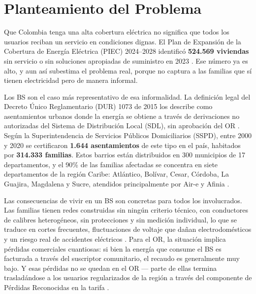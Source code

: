 \section{Planteamiento del Problema}
\label{sec:planteamiento}

Que Colombia tenga una alta cobertura eléctrica no significa que todos los usuarios reciban un servicio en condiciones dignas. El Plan de Expansión de la Cobertura de Energía Eléctrica (PIEC) 2024--2028 identificó \textbf{524.569 viviendas} sin servicio o sin soluciones apropiadas de suministro en 2023 \parencite{UPME2025}. Ese número ya es alto, y aun así subestima el problema real, porque no captura a las familias que sí tienen electricidad pero de manera informal.

Los BS son el caso más representativo de esa informalidad. La definición legal del Decreto Único Reglamentario (DUR) 1073 de 2015 los describe como asentamientos urbanos donde la energía se obtiene a través de derivaciones no autorizadas del Sistema de Distribución Local (SDL), sin aprobación del OR \parencite{DUR1073_2015}. Según la Superintendencia de Servicios Públicos Domiciliarios (SSPD), entre 2000 y 2020 se certificaron \textbf{1.644 asentamientos} de este tipo en el país, habitados por \textbf{314.333 familias}. Estos barrios están distribuidos en 300 municipios de 17 departamentos, y el 90\% de las familias afectadas se concentra en siete departamentos de la región Caribe: Atlántico, Bolívar, Cesar, Córdoba, La Guajira, Magdalena y Sucre, atendidos principalmente por Air-e y Afinia \parencite{SSPD2020}.

Las consecuencias de vivir en un BS son concretas para todos los involucrados. Las familias tienen redes construidas sin ningún criterio técnico, con conductores de calibres heterogéneos, sin protecciones y sin medición individual, lo que se traduce en cortes frecuentes, fluctuaciones de voltaje que dañan electrodomésticos y un riesgo real de accidentes eléctricos \parencite{SerranoRueda2019, VillagranRomero2022}. Para el OR, la situación implica pérdidas comerciales cuantiosas: si bien la energía que consume el BS es facturada a través del suscriptor comunitario, el recaudo es generalmente muy bajo. Y esas pérdidas no se quedan en el OR — parte de ellas termina trasladándose a los usuarios regularizados de la región a través del componente de Pérdidas Reconocidas en la tarifa \parencite{CastilloQuintana1991, ReySerrato2009}.

